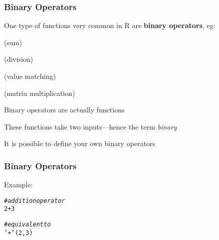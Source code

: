 \documentclass[12pt]{beamer}\usepackage[]{graphicx}\usepackage[]{color}
\makeatletter
\newcommand{\hlnum}[1]{\textcolor[rgb]{0.686,0.059,0.569}{#1}}%
\newcommand{\hlstr}[1]{\textcolor[rgb]{0.192,0.494,0.8}{#1}}%
\newcommand{\hlcom}[1]{\textcolor[rgb]{0.678,0.584,0.686}{\textit{#1}}}%
\newcommand{\hlopt}[1]{\textcolor[rgb]{0,0,0}{#1}}%
\newcommand{\hlstd}[1]{\textcolor[rgb]{0.345,0.345,0.345}{#1}}%
\newcommand{\hlkwa}[1]{\textcolor[rgb]{0.161,0.373,0.58}{\textbf{#1}}}%
\newcommand{\hlkwb}[1]{\textcolor[rgb]{0.69,0.353,0.396}{#1}}%
\newcommand{\hlkwc}[1]{\textcolor[rgb]{0.333,0.667,0.333}{#1}}%
\newcommand{\hlkwd}[1]{\textcolor[rgb]{0.737,0.353,0.396}{\textbf{#1}}}%
\newenvironment{kframe}{%
 \def\at@end@of@kframe{}%
 \ifinner\ifhmode%
  \def\at@end@of@kframe{\end{minipage}}%
  \begin{minipage}{\columnwidth}%
 \fi\fi%
 \def\FrameCommand##1{\hskip\@totalleftmargin \hskip-\fboxsep
 \colorbox{shadecolor}{##1}\hskip-\fboxsep
     \hskip-\linewidth \hskip-\@totalleftmargin \hskip\columnwidth}%
 \MakeFramed {\advance\hsize-\width
   \@totalleftmargin\z@ \linewidth\hsize
   \@setminipage}}%
 {\par\unskip\endMakeFramed%
 \at@end@of@kframe}
\newenvironment{knitrout}{}{} %
\makeatother
\begin{document}

\begin{frame}
\frametitle{Binary Operators}

\bi
  \item One type of functions very common in R are \textbf{binary operators}, eg:
  \bi
    \item {} (sum)
    \item {} (division)
    \item {} (value matching)
    \item {} (matrix multiplication)
  \ei
  \item Binary operators are actually functions
  \item These functions take two inputs---hence the term \textit{binary}
  \item It is possible to define your own binary operators
\ei

\end{frame}


\begin{frame}[fragile]
\frametitle{Binary Operators}

Example:
\begin{knitrout}\footnotesize
{}\color{fgcolor}\begin{kframe}
\begin{alltt}
\hlcom{# addition operator}
\hlnum{2} \hlopt{+} \hlnum{3}

\hlcom{# equivalent to}
\hlstr{'+'}\hlstd{(}\hlnum{2}\hlstd{,} \hlnum{3}\hlstd{)}
\end{alltt}
\end{kframe}
\end{knitrout}

\end{frame}


\end{document}
